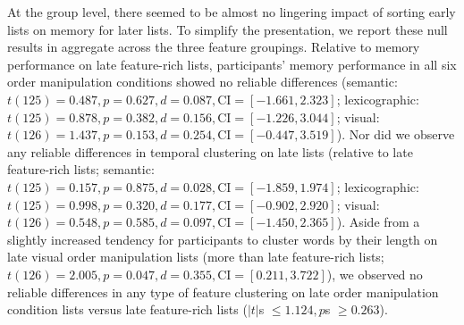 \documentclass[11pt]{article}
\begin{document}
At the group level, there seemed to be almost no lingering impact of sorting
early lists on memory for later lists. To simplify the presentation, we report
these null results in aggregate across the three feature groupings. Relative to
memory performance on late feature-rich lists, participants' memory performance
in all six order manipulation conditions showed no reliable differences
(semantic: $t(125) = 0.487, p = 0.627, d = 0.087, \mathrm{CI} = [-1.661,
2.323]$; lexicographic: $t(125) = 0.878, p = 0.382, d = 0.156, \mathrm{CI} =
[-1.226, 3.044]$; visual: $t(126) = 1.437, p = 0.153, d = 0.254, \mathrm{CI} =
[-0.447, 3.519]$). Nor did we observe any reliable differences in temporal
clustering on late lists (relative to late feature-rich lists; semantic:
$t(125) = 0.157, p = 0.875, d = 0.028, \mathrm{CI} = [-1.859, 1.974]$;
lexicographic: $t(125) = 0.998, p = 0.320, d = 0.177, \mathrm{CI} = [-0.902,
2.920]$; visual: $t(126) = 0.548, p = 0.585, d = 0.097, \mathrm{CI} = [-1.450,
2.365]$). Aside from a slightly increased tendency for participants to cluster
words by their length on late visual order manipulation lists (more than late
feature-rich lists; $t(126) = 2.005, p = 0.047, d = 0.355, \mathrm{CI} =
[0.211, 3.722]$), we observed no reliable differences in any type of feature
clustering on late order manipulation condition lists versus late feature-rich
lists ($|t|$s $\leq 1.124, p$s $\geq 0.263$).
\end{document}

